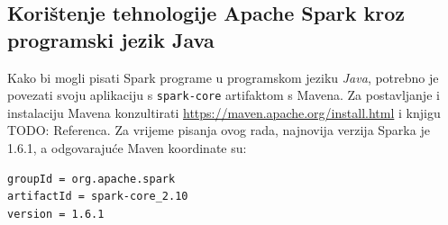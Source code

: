 \documentclass[times, utf8, zavrsni]{fer}
\begin{document}
\subsection{Korištenje tehnologije Apache Spark kroz programski jezik Java}
Kako bi mogli pisati Spark programe u programskom jeziku \emph{Java}, potrebno je povezati svoju aplikaciju s \texttt{spark-core} artifaktom s Mavena. Za postavljanje i instalaciju Mavena konzultirati \url{https://maven.apache.org/install.html} i knjigu TODO: Referenca. Za vrijeme pisanja ovog rada, najnovija verzija Sparka je 1.6.1, a odgovarajuće Maven koordinate su:
\begin{lstlisting}[language=bash, basicstyle=\small]
groupId = org.apache.spark
artifactId = spark-core_2.10
version = 1.6.1
\end{lstlisting}
\end{document}
